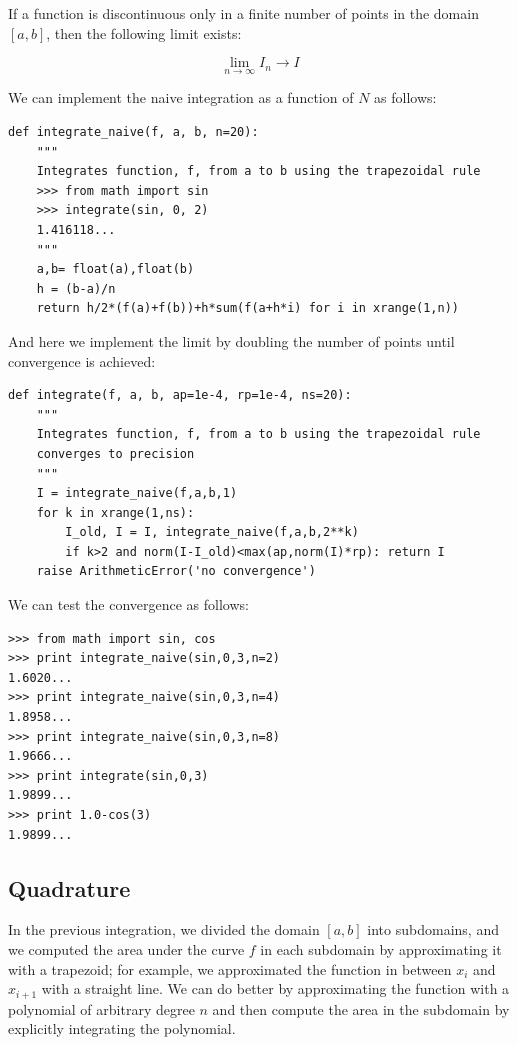 \documentclass[justified,sixbynine]{tufte-book}
\def\ft{\small\tt}
\theoremstyle{plain}%
\theoremstyle{definition}
\theoremstyle{remark}
\begin{document}
\begin{fullwidth}
If a function is discontinuous only in a finite number of points in the domain $[a,b]$, then the following limit exists:

\begin{equation}
\lim_{n\rightarrow\infty} I_n \rightarrow I
\end{equation}

We can implement the naive integration as a function of $N$ as follows:

\begin{lstlisting}[caption={in file: {\ft nlib.py}}]
def integrate_naive(f, a, b, n=20):
    """
    Integrates function, f, from a to b using the trapezoidal rule
    >>> from math import sin
    >>> integrate(sin, 0, 2)
    1.416118...
    """
    a,b= float(a),float(b)
    h = (b-a)/n
    return h/2*(f(a)+f(b))+h*sum(f(a+h*i) for i in xrange(1,n))
\end{lstlisting}

And here we implement the limit by doubling the number of points until convergence is achieved:

\begin{lstlisting}[caption={in file: {\ft nlib.py}}]
def integrate(f, a, b, ap=1e-4, rp=1e-4, ns=20):
    """
    Integrates function, f, from a to b using the trapezoidal rule
    converges to precision
    """
    I = integrate_naive(f,a,b,1)
    for k in xrange(1,ns):
        I_old, I = I, integrate_naive(f,a,b,2**k)
        if k>2 and norm(I-I_old)<max(ap,norm(I)*rp): return I
    raise ArithmeticError('no convergence')
\end{lstlisting}

We can test the convergence as follows:

\begin{lstlisting}[caption={in file: {\ft nlib.py}}]
>>> from math import sin, cos
>>> print integrate_naive(sin,0,3,n=2)
1.6020...
>>> print integrate_naive(sin,0,3,n=4)
1.8958...
>>> print integrate_naive(sin,0,3,n=8)
1.9666...
>>> print integrate(sin,0,3)
1.9899...
>>> print 1.0-cos(3)
1.9899...
\end{lstlisting}

\goodbreak\subsection{Quadrature}


In the previous integration, we divided the domain $[a,b]$ into subdomains, and we computed the area under the curve $f$ in each subdomain by approximating it with a trapezoid; for example, we approximated the function in between $x_i$ and $x_{i+1}$ with a straight line. We can do better by approximating the function with a polynomial of arbitrary degree $n$ and then compute the area in the subdomain by explicitly integrating the polynomial.


\end{fullwidth}
\end{document}
